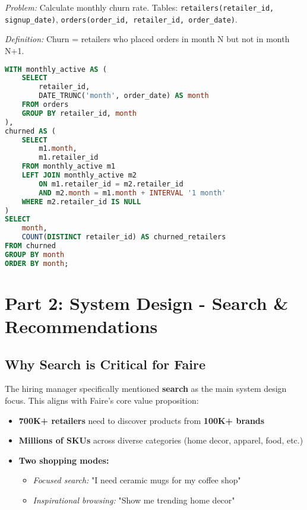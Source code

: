 \documentclass[11pt,letterpaper]{article}
\begin{document}
\textit{Problem:} Calculate monthly churn rate. Tables: \texttt{retailers(retailer\_id, signup\_date)}, \texttt{orders(order\_id, retailer\_id, order\_date)}.

\textit{Definition:} Churn = retailers who placed orders in month N but not in month N+1.

\begin{lstlisting}[language=SQL]
WITH monthly_active AS (
    SELECT
        retailer_id,
        DATE_TRUNC('month', order_date) AS month
    FROM orders
    GROUP BY retailer_id, month
),
churned AS (
    SELECT
        m1.month,
        m1.retailer_id
    FROM monthly_active m1
    LEFT JOIN monthly_active m2
        ON m1.retailer_id = m2.retailer_id
        AND m2.month = m1.month + INTERVAL '1 month'
    WHERE m2.retailer_id IS NULL
)
SELECT
    month,
    COUNT(DISTINCT retailer_id) AS churned_retailers
FROM churned
GROUP BY month
ORDER BY month;
\end{lstlisting}

\section{Part 2: System Design - Search \& Recommendations}

\subsection{Why Search is Critical for Faire}

The hiring manager specifically mentioned \textbf{search} as the main system design focus. This aligns with Faire's core value proposition:

\begin{itemize}
    \item \textbf{700K+ retailers} need to discover products from \textbf{100K+ brands}
    \item \textbf{Millions of SKUs} across diverse categories (home decor, apparel, food, etc.)
    \item \textbf{Two shopping modes:}
    \begin{itemize}
        \item \textit{Focused search:} "I need ceramic mugs for my coffee shop"
        \item \textit{Inspirational browsing:} "Show me trending home decor"
    \end{itemize}
\end{itemize}
\end{document}
